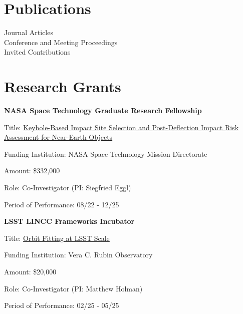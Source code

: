 \documentclass[margin,line]{res}
\newlength{\myitemspacing}
\newenvironment{list_new}{
    \begin{list}{\scriptsize{$\bullet$}}{%
        \setlength{\itemsep}{0in}
        \setlength{\parsep}{\myitemspacing} \setlength{\parskip}{0in}
        \setlength{\topsep}{0in} \setlength{\partopsep}{0in} 
        \setlength{\leftmargin}{0.2in}
        }}
    {\end{list}
}
\begin{document}
\begin{resume}
\section{\sc Publications}
 Journal Articles\\
 Conference and Meeting Proceedings\\
 Invited Contributions

\section{\sc Research Grants}
{\bf NASA Space Technology Graduate Research Fellowship}
\begin{list_new}
    \item Title: \href{https://techport.nasa.gov/projects/118462}{Keyhole-Based Impact Site Selection and Post-Deflection Impact Risk Assessment for Near-Earth Objects}
    \item Funding Institution: NASA Space Technology Mission Directorate
    \item Amount: \$332,000
    \item Role: Co-Investigator (PI: Siegfried Eggl)
    \item Period of Performance: 08/22 - 12/25
\end{list_new}

{\bf LSST LINCC Frameworks Incubator}
\begin{list_new}
    \item Title: \href{https://lsstdiscoveryalliance.org/programs/lincc-frameworks/incubator-awardees/#holman}{Orbit Fitting at LSST Scale}
    \item Funding Institution: Vera C. Rubin Observatory
    \item Amount: \$20,000 %
    \item Role: Co-Investigator (PI: Matthew Holman)
    \item Period of Performance: 02/25 - 05/25
\end{list_new}


\end{resume}
\end{document}
